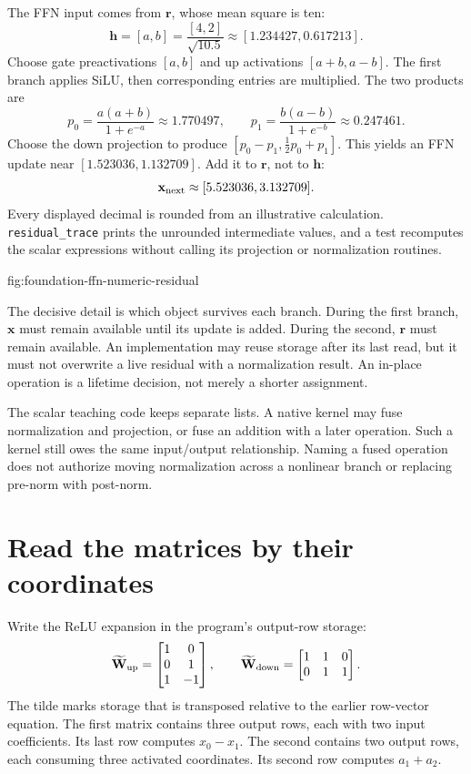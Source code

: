 The FFN input comes from $\mathbf r$, whose mean square is ten:
\[
 \mathbf h=[a,b]=\frac{[4,2]}{\sqrt{10.5}}
 \approx[1.234427,0.617213].
\]
Choose gate preactivations $[a,b]$ and up activations $[a+b,a-b]$.
The first branch applies SiLU, then corresponding entries are multiplied.
The two products are
\[
 p_0=\frac{a(a+b)}{1+e^{-a}}\approx1.770497,\qquad
 p_1=\frac{b(a-b)}{1+e^{-b}}\approx0.247461.
\]
Choose the down projection to produce
$[p_0-p_1,\frac12p_0+p_1]$. This yields an FFN update near
$[1.523036,1.132709]$. Add it to $\mathbf r$, not to $\mathbf h$:
\[
 \mathbf x_{\rm next}\approx[5.523036,3.132709].
\]
Every displayed decimal is rounded from an illustrative calculation.
\texttt{residual\_trace} prints the unrounded intermediate values, and a
test recomputes the scalar expressions without calling its projection or
normalization routines.
\begin{minipage}{\linewidth}
\end{minipage}

{fig:foundation-ffn-numeric-residual}

The decisive detail is which object survives each branch. During the first
branch, $\mathbf x$ must remain available until its update is added.
During the second, $\mathbf r$ must remain available. An implementation may
reuse storage after its last read, but it must not overwrite a live
residual with a normalization result. An in-place operation is a lifetime
decision, not merely a shorter assignment.

The scalar teaching code keeps separate lists. A native kernel may fuse
normalization and projection, or fuse an addition with a later operation.
Such a kernel still owes the same input/output relationship. Naming a
fused operation does not authorize moving normalization across a
nonlinear branch or replacing pre-norm with post-norm.

\section{Read the matrices by their coordinates}
Write the ReLU expansion in the program's output-row storage:
\[
 \widetilde{\mathbf W}_{\rm up}=
 \begin{bmatrix}1&0\\0&1\\1&-1\end{bmatrix},\qquad
 \widetilde{\mathbf W}_{\rm down}=
 \begin{bmatrix}1&1&0\\0&1&1\end{bmatrix}.
\]
The tilde marks storage that is transposed relative to the earlier
row-vector equation. The first matrix contains three output rows, each
with two input coefficients. Its last row computes $x_0-x_1$.
The second contains two output rows, each consuming three activated
coordinates. Its second row computes $a_1+a_2$.

